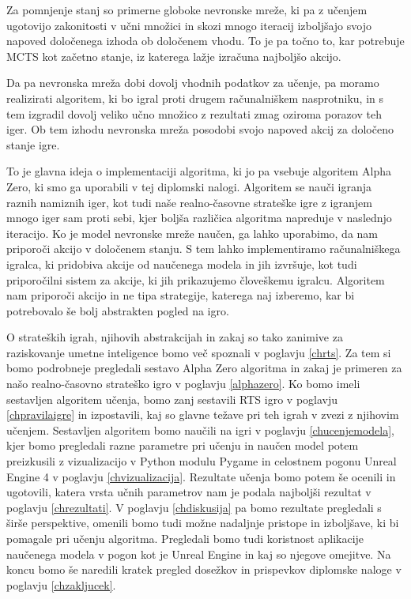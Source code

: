 \documentclass[a4paper, 12pt]{book}
\begin{document}
Za pomnjenje stanj so primerne globoke nevronske mreže, ki pa z učenjem ugotovijo zakonitosti v učni množici in skozi mnogo iteracij izboljšajo svojo napoved določenega izhoda ob določenem vhodu. 
To je pa točno to, kar potrebuje MCTS kot začetno stanje, iz katerega lažje izračuna najboljšo akcijo.

Da pa nevronska mreža dobi dovolj vhodnih podatkov za učenje, pa moramo realizirati algoritem, ki bo igral proti drugem računalniškem nasprotniku, in s tem izgradil dovolj veliko učno množico z rezultati zmag oziroma porazov teh iger. 
Ob tem izhodu nevronska mreža posodobi svojo napoved akcij za določeno stanje igre.

To je glavna ideja o implementaciji algoritma, ki jo pa vsebuje algoritem Alpha Zero, ki smo ga uporabili v tej diplomski nalogi.
Algoritem se nauči igranja raznih namiznih iger, kot tudi naše realno-časovne strateške igre z igranjem mnogo iger sam proti sebi, kjer boljša različica algoritma napreduje v naslednjo iteracijo.
Ko je model nevronske mreže naučen, ga lahko uporabimo, da nam priporoči akcijo v določenem stanju.
S tem lahko implementiramo računalniškega igralca, ki pridobiva akcije od naučenega modela in jih izvršuje, kot tudi priporočilni sistem za akcije, ki jih prikazujemo človeškemu igralcu. 
Algoritem nam priporoči akcijo in ne tipa strategije, katerega naj izberemo, kar bi potrebovalo še bolj abstrakten pogled na igro. 

O strateških igrah, njihovih abstrakcijah in zakaj so tako zanimive za raziskovanje umetne inteligence bomo več spoznali v poglavju \ref{chrts}.
Za tem si bomo podrobneje pregledali sestavo Alpha Zero algoritma in zakaj je primeren za našo realno-časovno strateško igro v poglavju \ref{alphazero}.
Ko bomo imeli sestavljen algoritem učenja, bomo zanj sestavili RTS igro v poglavju \ref{chpravilaigre} in izpostavili, kaj so glavne težave pri teh igrah v zvezi z njihovim učenjem.
Sestavljen algoritem bomo naučili na igri v poglavju \ref{chucenjemodela}, kjer bomo pregledali razne parametre pri učenju in naučen model potem preizkusili z vizualizacijo v Python modulu Pygame in celostnem pogonu Unreal Engine 4 v poglavju \ref{chvizualizacija}.
Rezultate učenja bomo potem še ocenili in ugotovili, katera vrsta učnih parametrov nam je podala najboljši rezultat v poglavju \ref{chrezultati}.
V poglavju \ref{chdiskusija} pa bomo rezultate pregledali s širše perspektive, omenili bomo tudi možne nadaljnje pristope in izboljšave, ki bi pomagale pri učenju algoritma. 
Pregledali bomo tudi koristnost aplikacije naučenega modela v pogon kot je Unreal Engine in kaj so njegove omejitve.
Na koncu bomo še naredili kratek pregled dosežkov in prispevkov diplomske naloge v poglavju \ref{chzakljucek}.
\end{document}
